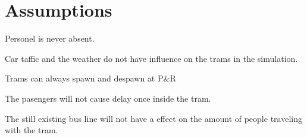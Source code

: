 \section{Assumptions}

Personel is never absent.

Car taffic and the weather do not have influence on the trams in the simulation.

Trams can always spawn and despawn at P\&R

The pasengers will not cause delay once inside the tram.

The still existing bus line will not have a effect on the amount of people traveling 
with the tram. 